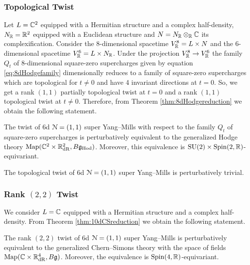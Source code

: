 \documentclass[10pt, oneside]{article}
\newcommand{\Hod}{\mathrm{Hod}}
\begin{document}
\subsubsection{Topological Twist}
\label{sect:6d11topologicaltwist}

Let $L=\mathbb C^2$ equipped with a Hermitian structure and a complex half-density, $N_\mathbb R=\mathbb R^2$ equipped with a Euclidean structure and $N=N_\mathbb R\otimes_\mathbb R\mathbb C$ its complexification. Consider the 8-dimensional spacetime $V^8_\mathbb R=L\times N$ and the 6-dimensional spacetime $V^6_\mathbb R=L\times N_\mathbb R$. Under the projection $V^8_\mathbb R\rightarrow V^6_\mathbb R$ the family $Q_t$ of 8-dimensional square-zero supercharges given by equation \eqref{eq:8dHodgefamily} dimensionally reduces to a family of square-zero supercharges which are topological for $t\neq 0$ and have 4 invariant directions at $t=0$. So, we get a rank $(1, 1)$ partially topological twist at $t=0$ and a rank $(1, 1)$ topological twist at $t\neq 0$. Therefore, from Theorem \ref{thm:8dHodgereduction} we obtain the following statement.

\begin{theorem}
The twist of 6d $\mathcal N=(1, 1)$ super Yang--Mills with respect to the family $Q_t$ of square-zero supercharges is perturbatively equivalent to the generalized Hodge theory $\map(\CC^2\times \RR^2_{\mathrm{dR}}, B\fg_{\Hod})$. Moreover, this equivalence is $\mathrm{SU}(2)\times \mathrm{Spin}(2, \mathbb R)$-equivariant.
\label{thm:6dHodgetwist}
\end{theorem}

\begin{corollary}
The topological twist of 6d $\mathcal N=(1, 1)$ super Yang--Mills is perturbatively trivial.
\end{corollary}

\subsubsection{Rank \texorpdfstring{$(2, 2)$}{(2,2)} Twist}
\label{sect:6drank22twist}

We consider $L=\mathbb C$ equipped with a Hermitian structure and a complex half-density. From Theorem \ref{thm:10dCSreduction} we obtain the following statement.

\begin{theorem}
The rank $(2, 2)$ twist of 6d $\mathcal N=(1, 1)$ super Yang--Mills is perturbatively equivalent to the generalized Chern--Simons theory with the space of fields $\operatorname{Map}(\mathbb C\times \mathbb R^4_{\mathrm{dR}}, B\mathfrak g)$. Moreover, the equivalence is $\mathrm{Spin}(4, \mathbb R)$-equivariant.
\label{thm:6drank22}
\end{theorem}
\end{document}
